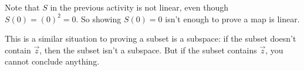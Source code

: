 \begin{applicationActivities}
\begin{observation}
  Note that \(S\) in the previous activity is not linear,
  even though \(S(0)=(0)^2=0\). So showing \(S(0)=0\) isn't enough
  to prove a map is linear.

  \vspace{1em}

  This is a similar situation to proving a subset is a subspace:
  if the subset doesn't contain \(\vec z\), then
  the subset isn't a subspace. But if the subset contains \(\vec z\),
  you cannot conclude anything.
\end{observation}

\end{applicationActivities}
